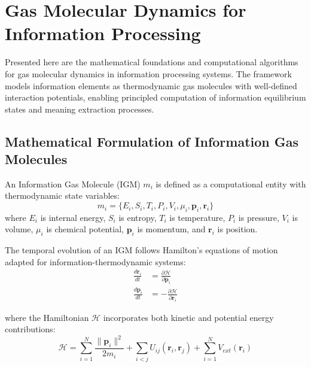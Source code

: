 \section{Gas Molecular Dynamics for Information Processing}
\label{sec:gas-molecular-dynamics}

Presented here are the mathematical foundations and computational algorithms for gas molecular dynamics in information processing systems. The framework models information elements as thermodynamic gas molecules with well-defined interaction potentials, enabling principled computation of information equilibrium states and meaning extraction processes.

\subsection{Mathematical Formulation of Information Gas Molecules}

\begin{definition}
An Information Gas Molecule (IGM) $m_i$ is defined as a computational entity with thermodynamic state variables:
\begin{equation}
m_i = \{E_i, S_i, T_i, P_i, V_i, \mu_i, \mathbf{p}_i, \mathbf{r}_i\}
\label{eq:igm-definition}
\end{equation}
where $E_i$ is internal energy, $S_i$ is entropy, $T_i$ is temperature, $P_i$ is pressure, $V_i$ is volume, $\mu_i$ is chemical potential, $\mathbf{p}_i$ is momentum, and $\mathbf{r}_i$ is position.
\end{definition}

The temporal evolution of an IGM follows Hamilton's equations of motion adapted for information-thermodynamic systems:
\begin{align}
\frac{d\mathbf{r}_i}{dt} &= \frac{\partial \mathcal{H}}{\partial \mathbf{p}_i} \label{eq:position-evolution} \\
\frac{d\mathbf{p}_i}{dt} &= -\frac{\partial \mathcal{H}}{\partial \mathbf{r}_i} \label{eq:momentum-evolution}
\end{align}

where the Hamiltonian $\mathcal{H}$ incorporates both kinetic and potential energy contributions:
\begin{equation}
\mathcal{H} = \sum_{i=1}^{N} \frac{\|\mathbf{p}_i\|^2}{2m_i} + \sum_{i<j} U_{ij}(\mathbf{r}_i, \mathbf{r}_j) + \sum_{i=1}^{N} V_{ext}(\mathbf{r}_i)
\label{eq:hamiltonian}
\end{equation}

